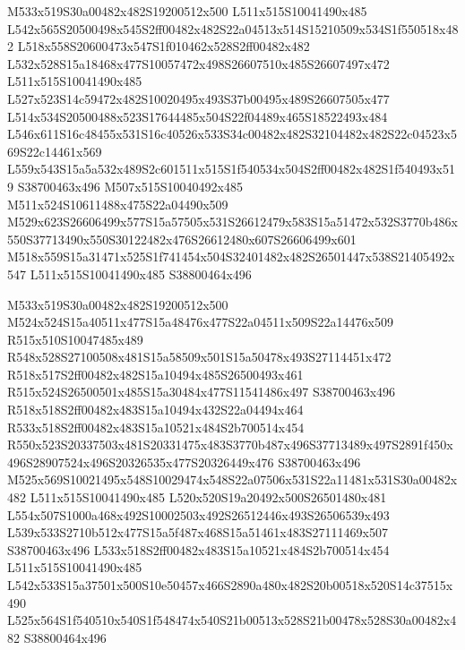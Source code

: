 \documentclass{article}
\begin{document}
\begin{multicols}{2}
M533x519S30a00482x482S19200512x500 L511x515S10041490x485 L542x565S20500498x545S2ff00482x482S22a04513x514S15210509x534S1f550518x482 L518x558S20600473x547S1f010462x528S2ff00482x482 L532x528S15a18468x477S10057472x498S26607510x485S26607497x472 L511x515S10041490x485 L527x523S14c59472x482S10020495x493S37b00495x489S26607505x477 L514x534S20500488x523S17644485x504S22f04489x465S18522493x484 L546x611S16c48455x531S16c40526x533S34c00482x482S32104482x482S22c04523x569S22c14461x569 L559x543S15a5a532x489S2c601511x515S1f540534x504S2ff00482x482S1f540493x519 S38700463x496 M507x515S10040492x485 M511x524S10611488x475S22a04490x509 M529x623S26606499x577S15a57505x531S26612479x583S15a51472x532S3770b486x550S37713490x550S30122482x476S26612480x607S26606499x601 M518x559S15a31471x525S1f741454x504S32401482x482S26501447x538S21405492x547 L511x515S10041490x485 S38800464x496

M533x519S30a00482x482S19200512x500 M524x524S15a40511x477S15a48476x477S22a04511x509S22a14476x509 R515x510S10047485x489 R548x528S27100508x481S15a58509x501S15a50478x493S27114451x472 R518x517S2ff00482x482S15a10494x485S26500493x461 R515x524S26500501x485S15a30484x477S11541486x497 S38700463x496 R518x518S2ff00482x483S15a10494x432S22a04494x464 R533x518S2ff00482x483S15a10521x484S2b700514x454 R550x523S20337503x481S20331475x483S3770b487x496S37713489x497S2891f450x496S28907524x496S20326535x477S20326449x476 S38700463x496 M525x569S10021495x548S10029474x548S22a07506x531S22a11481x531S30a00482x482 L511x515S10041490x485 L520x520S19a20492x500S26501480x481 L554x507S1000a468x492S10002503x492S26512446x493S26506539x493 L539x533S2710b512x477S15a5f487x468S15a51461x483S27111469x507 S38700463x496 L533x518S2ff00482x483S15a10521x484S2b700514x454 L511x515S10041490x485 L542x533S15a37501x500S10e50457x466S2890a480x482S20b00518x520S14c37515x490 L525x564S1f540510x540S1f548474x540S21b00513x528S21b00478x528S30a00482x482 S38800464x496


\end{multicols}
\end{document}
